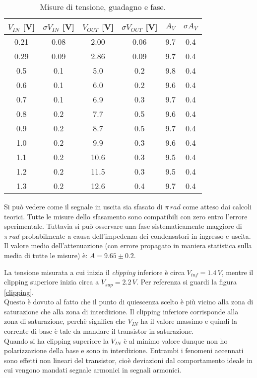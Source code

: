 \documentclass[10pt,a4paper]{article}
\begin{document}
\begin{table}[!hbt]
\centering
\begin{tabular}{|c|c|c|c|c|c|}
\hline 
$V_{IN}$ [V] & $\sigma V_{IN}$ [V] & $V_{OUT}$ [V]& $\sigma V_{OUT}$ [V] & $A_V$ & $\sigma A_V$ \\ 
\hline
0.21 & 0.08 & 2.00 & 0.06 & 9.7 & 0.4\\
0.29 & 0.09 & 2.86 & 0.09 & 9.7 & 0.4\\
0.5 & 0.1 & 5.0 & 0.2 & 9.8 & 0.4\\
0.6 & 0.1 & 6.0 & 0.2 & 9.6 & 0.4\\
0.7 & 0.1 & 6.9 & 0.3 & 9.7 & 0.4\\
0.8 & 0.2 & 7.7 & 0.5 & 9.6 & 0.4\\
0.9 & 0.2 & 8.7 & 0.5 & 9.7 & 0.4\\
1.0 & 0.2 & 9.9 & 0.3 & 9.6 & 0.4\\
1.1 & 0.2 & 10.6 & 0.3 & 9.5 & 0.4\\
1.2 & 0.2 & 11.5 & 0.3 & 9.5 & 0.4\\
1.3 & 0.2 & 12.6 & 0.4 & 9.7 & 0.4\\
\hline
\end{tabular}
\caption{Misure di tensione, guadagno e fase.} \label{ampiezza}
\end{table}


Si può vedere come il segnale in uscita sia sfasato di $\pi \, rad$ come atteso dai calcoli teorici. Tutte le misure dello sfasamento sono compatibili con zero entro l'errore sperimentale. Tuttavia si può osservare una fase sistematicamente maggiore di $\pi \, rad$ probabilmente a causa dell'impedenza dei condensatori in ingresso e uscita. Il valore medio dell'attenuazione (con errore propagato in maniera statistica sulla media di tutte le misure) è: $A = 9.65 \pm 0.2$.

La tensione misurata a cui inizia il \emph{clipping} inferiore è circa $V_{inf} = 1.4 \,V$, mentre il clipping superiore inizia circa a $V_{sup} = 2.2 \, V$. Per referenza si guardi la figura \ref{clipping}.\\
Questo è dovuto al fatto che il punto di quiescenza scelto è più vicino alla zona di saturazione che alla zona di interdizione. Il clipping inferiore corrisponde alla zona di saturazione, perchè significa che $V_{IN}$ ha il valore massimo e quindi la corrente di base è tale da mandare il transistor in saturazione.\\
Quando si ha clipping superiore la $V_{IN}$ è al minimo valore dunque non ho polarizzazione della base e sono in interdizione.
Entrambi i fenomeni accennati sono effetti non lineari del transistor, cioè deviazioni dal comportamento ideale in cui vengono mandati segnale armonici in segnali armonici.\\
\end{document}
